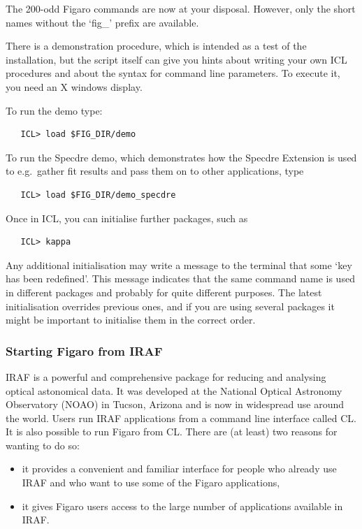    The 200-odd Figaro commands are now at your disposal. However, only
   the short names without the `fig\_' prefix are available.

   There is a demonstration procedure, which is intended as a test of 
   the installation, but the
   script itself can give you hints about writing your own ICL
   procedures and about the syntax for command line parameters. 
   To execute it, you need an X windows display. 

   To run the demo type:

\begin{verbatim}
   ICL> load $FIG_DIR/demo
\end{verbatim}

   To run the Specdre demo, which  
   demonstrates how the Specdre Extension is used to e.g.\ gather fit
   results and pass them on to other applications, type

\begin{verbatim}
   ICL> load $FIG_DIR/demo_specdre
\end{verbatim}

   Once in ICL, you can initialise further packages, such as

\begin{verbatim}
   ICL> kappa
\end{verbatim}

   Any additional initialisation may write a message to the terminal that
   some `key has been redefined'.  This message indicates that the same
   command name is used in different packages and probably for quite
   different purposes.  The latest initialisation overrides previous ones,
   and if you are using several packages it might be important to
   initialise them in the correct order.

\subsubsection{Starting Figaro from IRAF}

   IRAF is a powerful and comprehensive package for reducing and
   analysing optical astonomical data.  It was developed at the
   National Optical Astronomy Observatory (NOAO) in Tucson, Arizona and
   is now in widespread use around the world.  Users run IRAF
   applications from a command line interface called CL.  It is also
   possible to run Figaro from CL.  There are (at least) two reasons
   for wanting to do so:

  \begin{itemize}

    \item it provides a convenient and familiar interface for people
     who already use IRAF and who want to use some of the Figaro
     applications,

    \item it gives Figaro users access to the large number of
     applications available in IRAF.

  \end{itemize}

